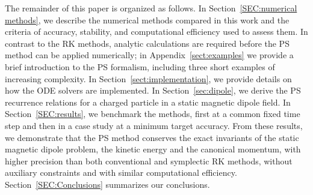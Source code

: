 \documentclass[draft]{agujournal2019}
\begin{document}

The remainder of this paper is organized as follows. In Section~\ref{SEC:numerical methods}, we describe the numerical methods compared in this work and the criteria of accuracy, stability, and computational efficiency used to assess them. In contrast to the RK methods, analytic calculations are required before the PS method can be applied numerically; in Appendix~\ref{sect:examples} we provide a brief introduction to the PS formalism, including three short examples of increasing complexity. In Section~\ref{sect:implementation}, we provide details on how the ODE solvers are implemented. In Section~\ref{sec:dipole}, we derive the PS recurrence relations for a charged particle in a static magnetic dipole field. In Section~\ref{SEC:results}, we benchmark the methods, first at a common fixed time step and then in a case study at a minimum target accuracy. From these results, we demonstrate that the PS method conserves the exact invariants of the static magnetic dipole problem, the kinetic energy and the canonical momentum, with higher precision than both conventional and symplectic RK methods, without auxiliary constraints and with similar computational efficiency. Section~\ref{SEC:Conclusions} summarizes our conclusions.
\end{document}
